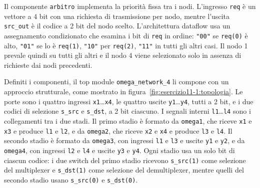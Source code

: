 Il componente \texttt{arbitro} implementa la priorità fissa tra i nodi. L'ingresso \texttt{req} è un vettore a 4 bit con una richiesta di trasmissione per nodo, mentre l'uscita \texttt{src\_out} è il codice a 2 bit del nodo scelto. L'architettura dataflow usa un assegnamento condizionato che esamina i bit di \texttt{req} in ordine: \texttt{"00"} se \texttt{req(0)} è alto, \texttt{"01"} se lo è \texttt{req(1)}, \texttt{"10"} per \texttt{req(2)}, \texttt{"11"} in tutti gli altri casi. Il nodo 1 prevale quindi su tutti gli altri e il nodo 4 viene selezionato solo in assenza di richieste dai nodi precedenti.


Definiti i componenti, il top module \texttt{omega\_network\_4} li compone con un approccio strutturale, come mostrato in figura~\ref{fig:esercizio11-1:topologia}. Le porte sono i quattro ingressi \texttt{x1}\ldots\texttt{x4}, le quattro uscite \texttt{y1}\ldots\texttt{y4}, tutti a 2 bit, e i due codici di selezione \texttt{s\_src} e \texttt{s\_dst}, a 2 bit ciascuno. I segnali interni \texttt{l1}\ldots\texttt{l4} sono i collegamenti tra i due stadi. Il primo stadio è formato da \texttt{omega1}, che riceve \texttt{x1} e \texttt{x3} e produce \texttt{l1} e \texttt{l2}, e da \texttt{omega2}, che riceve \texttt{x2} e \texttt{x4} e produce \texttt{l3} e \texttt{l4}. Il secondo stadio è formato da \texttt{omega3}, con ingressi \texttt{l1} e \texttt{l3} e uscite \texttt{y1} e \texttt{y2}, e da \texttt{omega4}, con ingressi \texttt{l2} e \texttt{l4} e uscite \texttt{y3} e \texttt{y4}. Ogni stadio usa un solo bit di ciascun codice: i due switch del primo stadio ricevono \texttt{s\_src(1)} come selezione del multiplexer e \texttt{s\_dst(1)} come selezione del demultiplexer, mentre quelli del secondo stadio usano \texttt{s\_src(0)} e \texttt{s\_dst(0)}.



